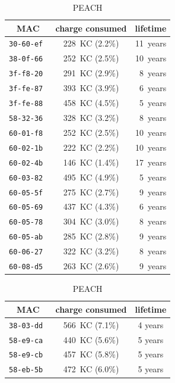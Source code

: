 \documentclass{elsarticle}
\begin{document}
\begin{table}
\begin{subtable}{.4\textwidth}
    \begin{tabular}{|c|c|r|}
        \toprule
        MAC    & charge consumed           &   lifetime \\
        \midrule
        \tt{30-60-ef}  & 228~KC (2.2\%) & 11~years \\
        \tt{38-0f-66}  & 252~KC (2.5\%) & 10~years \\
        \tt{3f-f8-20}  & 291~KC (2.9\%) & 8~years \\
        \tt{3f-fe-87}  & 393~KC (3.9\%) & 6~years \\
        \tt{3f-fe-88}  & 458~KC (4.5\%) & 5~years \\
        \tt{58-32-36}  & 328~KC (3.2\%) & 8~years \\
        \tt{60-01-f8}  & 252~KC (2.5\%) & 10~years \\
        \tt{60-02-1b}  & 222~KC (2.2\%) & 10~years \\
        \tt{60-02-4b}  & 146~KC (1.4\%) & 17~years \\
        \tt{60-03-82}  & 495~KC (4.9\%) & 5~years \\
        \tt{60-05-5f}  & 275~KC (2.7\%) & 9~years \\
        \tt{60-05-69}  & 437~KC (4.3\%) & 6~years \\
        \tt{60-05-78}  & 304~KC (3.0\%) & 8~years \\
        \tt{60-05-ab}  & 285~KC (2.8\%) & 9~years \\
        \tt{60-06-27}  & 322~KC (3.2\%) & 8~years \\
        \tt{60-08-d5}  & 263~KC (2.6\%) & 9~years \\
        \bottomrule
    \end{tabular}
    \caption{PEACH}
\end{subtable}\hfill
\begin{subtable}{.45\textwidth}
    \begin{tabular}{|c|c|c|}
        \toprule
        MAC &  charge consumed & lifetime \\
        \midrule
        \tt{38-03-dd} &  566~KC (7.1\%)  &  4 years \\
        \tt{58-e9-ca} &  440~KC (5.6\%)  &  5 years \\
        \tt{58-e9-cb} &  457~KC (5.8\%)  &  5 years \\
        \tt{58-eb-5b} &  472~KC (6.0\%)  &  5 years \\

\end{tabular}
\end{subtable}
\end{table}
\end{document}

